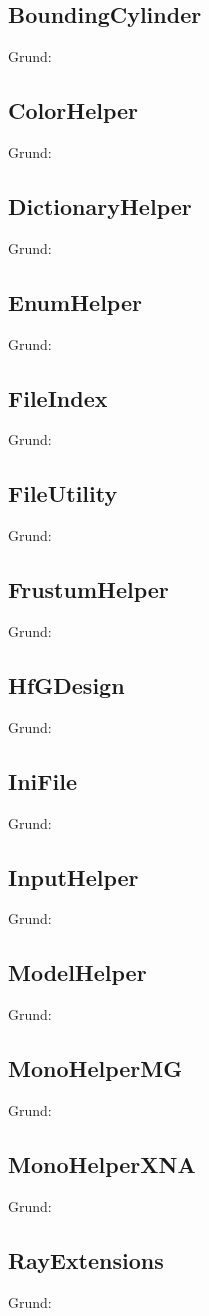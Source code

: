 \subsection{BoundingCylinder}
Grund:
\subsection{ColorHelper}
Grund:
\subsection{DictionaryHelper}
Grund:
\subsection{EnumHelper}
Grund:
\subsection{FileIndex}
Grund:
\subsection{FileUtility}
Grund:
\subsection{FrustumHelper}
Grund:
\subsection{HfGDesign}
Grund:
\subsection{IniFile}
Grund:
\subsection{InputHelper}
Grund:
\subsection{ModelHelper}
Grund:
\subsection{MonoHelperMG}
Grund:
\subsection{MonoHelperXNA}
Grund:
\subsection{RayExtensions}
Grund:
